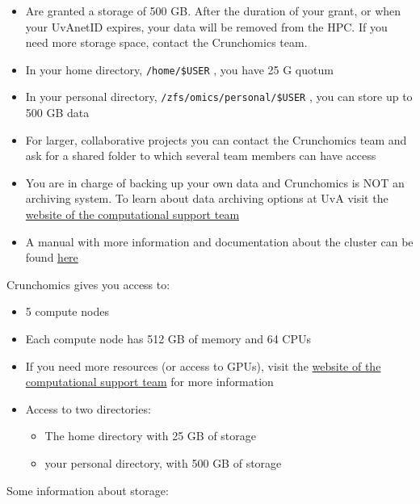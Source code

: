 \documentclass[
  letterpaper,
  DIV=11,
  numbers=noendperiod]{scrreprt}
\providecommand{\tightlist}{%
  \setlength{\itemsep}{0pt}\setlength{\parskip}{0pt}}\usepackage{longtable,booktabs,array}
\begin{document}
\begin{itemize}
\tightlist
\item
  Are granted a storage of 500 GB. After the duration of your grant, or
  when your UvAnetID expires, your data will be removed from the HPC. If
  you need more storage space, contact the Crunchomics team.
\item
  In your home directory, \texttt{/home/\$USER} , you have 25 G quotum
\item
  In your personal directory, \texttt{/zfs/omics/personal/\$USER} , you
  can store up to 500 GB data
\item
  For larger, collaborative projects you can contact the Crunchomics
  team and ask for a shared folder to which several team members can
  have access
\item
  You are in charge of backing up your own data and Crunchomics is NOT
  an archiving system. To learn about data archiving options at UvA
  visit the
  \href{https://ibed.uva.nl/facilities/computational-facilities/ibed-computational-support-team/ibed-computational-support-team.html}{website
  of the computational support team}
\item
  A manual with more information and documentation about the cluster can
  be found
  \href{https://crunchomics-documentation.readthedocs.io/en/latest}{here}
\end{itemize}

Crunchomics gives you access to:

\begin{itemize}
\tightlist
\item
  5 compute nodes
\item
  Each compute node has 512 GB of memory and 64 CPUs
\item
  If you need more resources (or access to GPUs), visit the
  \href{https://ibed.uva.nl/facilities/computational-facilities/ibed-computational-support-team/ibed-computational-support-team.html}{website
  of the computational support team} for more information
\item
  Access to two directories:

  \begin{itemize}
  \tightlist
  \item
    The home directory with 25 GB of storage
  \item
    your personal directory, with 500 GB of storage
  \end{itemize}
\end{itemize}

Some information about storage:
\end{document}
